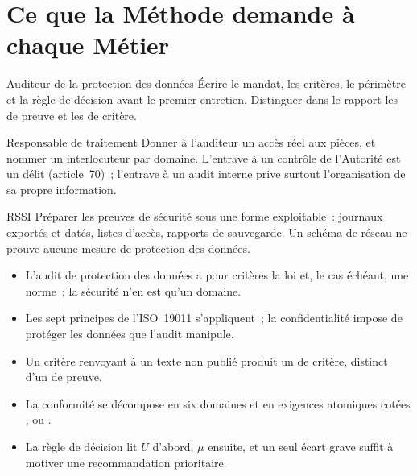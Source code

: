 \section{Ce que la Méthode demande à chaque Métier}
\label{sec:c03-metiers}

\begin{boxmetier}{Auditeur de la protection des données}
Écrire le mandat, les critères, le périmètre et la règle de décision avant
le premier entretien. Distinguer dans le rapport les \NEK{} de preuve et les
\NEK{} de critère.
\end{boxmetier}

\begin{boxmetier}{Responsable de traitement}
Donner à l'auditeur un accès réel aux pièces, et nommer un interlocuteur
par domaine. L'entrave à un contrôle de l'Autorité est un délit
(article~70)~; l'entrave à un audit interne prive surtout l'organisation
de sa propre information.
\end{boxmetier}

\begin{boxmetier}{RSSI}
Préparer les preuves de sécurité sous une forme exploitable~: journaux
exportés et datés, listes d'accès, rapports de sauvegarde. Un schéma de
réseau ne prouve aucune mesure de protection des données.
\end{boxmetier}

\begin{boxresume}
\begin{itemize}
    \item L'audit de protection des données a pour critères la loi et, le
          cas échéant, une norme~; la sécurité n'en est qu'un domaine.
    \item Les sept principes de l'ISO~19011 s'appliquent~; la
          confidentialité impose de protéger les données que l'audit
          manipule.
    \item Un critère renvoyant à un texte non publié produit un \NEK{} de
          critère, distinct d'un \NEK{} de preuve.
    \item La conformité se décompose en six domaines et en exigences
          atomiques cotées \OUI{}, \NON{} ou \NEK{}.
    \item La règle de décision lit $U$ d'abord, $\mu$ ensuite, et un seul
          écart grave suffit à motiver une recommandation prioritaire.
\end{itemize}
\end{boxresume}

